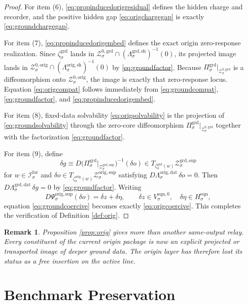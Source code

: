 \documentclass[11pt]{article}
\newcommand{\ForSpace}[1]{\mathcal I_{#1}^{\mathrm{for}}}
\newcommand{\OrigData}[1]{\Lambda_{#1}^{\mathrm{orig,dat}}}
\newcommand{\OrigShellMap}[1]{\Lambda_{#1}^{\mathrm{orig,sh}}}
\newcommand{\OrigSupportShell}[1]{\mathcal Z_{#1}^{\mathrm{orig,sup}}}
\newcommand{\OrigZeroCore}[1]{\mathcal Z_{#1}^{0,\mathrm{orig}}}
\newcommand{\OrigEqChart}[1]{\Psi_{#1}^{\mathrm{orig,sup}}}
\newcommand{\OrigEmbed}[1]{\zeta_{#1}^{\mathrm{orig}}}
\newcommand{\GroundProj}[1]{\Pi_{#1}^{\mathrm{grd}}}
\newcommand{\GroundData}[1]{\Lambda_{#1}^{\mathrm{grd,dat}}}
\newcommand{\GroundShellMap}[1]{\Lambda_{#1}^{\mathrm{grd,sh}}}
\newcommand{\GroundSupportShell}[1]{\mathcal Z_{#1}^{\mathrm{grd,sup}}}
\newcommand{\GroundZeroCore}[1]{\mathcal Z_{#1}^{0,\mathrm{grd}}}
\newcommand{\GroundEmbed}[1]{\zeta_{#1}^{\mathrm{grd}}}
\newcommand{\EqnHidden}[1]{H_{#1}^{\mathrm{eqn}}}
\newcommand{\EqnZero}[1]{V_{#1}^{\mathrm{eqn},0}}
\newtheorem{remark}{Remark}
\begin{document}
\begin{proof}
For item (6), \eqref{eq:propinducedorigresidual} defines the hidden charge and recorder, and the positive hidden gap \eqref{eq:origchargegap} is exactly \eqref{eq:groundchargegap}.

For item (7), \eqref{eq:propinducedorigembed} defines the exact origin zero-response realization. Since \(\GroundEmbed{\sigma}\) lands in \(\GroundZeroCore{\sigma}\cap(\GroundShellMap{\sigma})^{-1}(0)\), its projected image lands in \(\OrigZeroCore{\sigma}\cap(\OrigShellMap{\sigma})^{-1}(0)\) by \eqref{eq:groundfactor}. Because \(\GroundProj{\sigma}\big|_{\GroundZeroCore{\sigma}}\) is a diffeomorphism onto \(\OrigZeroCore{\sigma}\), the image is exactly that zero-response locus. Equation \eqref{eq:origcompat} follows immediately from \eqref{eq:groundcompat}, \eqref{eq:groundfactor}, and \eqref{eq:propinducedorigembed}.

For item (8), fixed-data solvability \eqref{eq:origsolvability} is the projection of \eqref{eq:groundsolvability} through the zero-core diffeomorphism \(\GroundProj{\sigma}\big|_{\GroundZeroCore{\sigma}}\) together with the factorization \eqref{eq:groundfactor}.

For item (9), define
\[
\delta g
\equiv
D\bigl(\GroundProj{\sigma}\big|_{\GroundSupportShell{\sigma}}\bigr)^{-1}(\delta o)
\in
T_{\GroundEmbed{\sigma}(w)}\GroundSupportShell{\sigma}
\]
for \(w\in\ForSpace{\sigma}\) and \(\delta o\in T_{\OrigEmbed{\sigma}(w)}\OrigSupportShell{\sigma}\) satisfying \(D\OrigData{\sigma}\,\delta o=0\). Then \(D\GroundData{\sigma}\,\delta g=0\) by \eqref{eq:groundfactor}. Writing
\[
D\OrigEqChart{\sigma}(\delta o)=\delta z+\delta\eta,
\qquad
\delta z\in\EqnZero{\sigma},
\quad
\delta\eta\in\EqnHidden{\sigma},
\]
equation \eqref{eq:groundcoercive} becomes exactly \eqref{eq:origcoercive}. This completes the verification of Definition \ref{def:orig}.
\end{proof}

\begin{remark}
Proposition \ref{prop:orig} gives more than another same-output relay. Every constituent of the current origin package is now an explicit projected or transported image of deeper ground data. The origin layer has therefore lost its status as a free insertion on the active line.
\end{remark}

\section{Benchmark Preservation}
\end{document}
